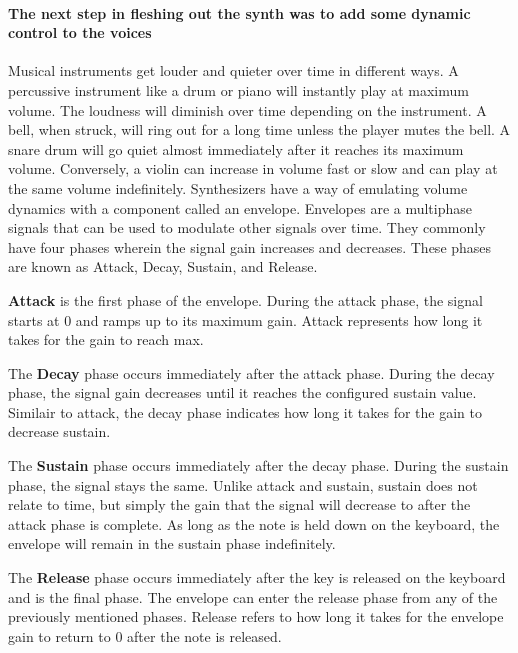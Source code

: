 \documentclass[acmlarge,screen]{acmart}
\begin{document}
	\paragraph{The next step in fleshing out the synth was to add some dynamic control to the voices} Musical instruments get louder and quieter over time in different ways. A percussive instrument like a drum or piano will instantly play at maximum volume. The loudness will diminish over time depending on the instrument. A bell, when struck, will ring out for a long time unless the player mutes the bell. A snare drum will go quiet almost immediately after it reaches its maximum volume. Conversely, a violin can increase in volume fast or slow and can play at the same volume indefinitely. Synthesizers have a way of emulating volume dynamics with a component called an envelope. Envelopes are a multiphase signals that can be used to modulate other signals over time. They commonly have four phases wherein the signal gain increases and decreases. These phases are known as Attack, Decay, Sustain, and Release.
	
	\textbf{Attack} is the first phase of the envelope. During the attack phase, the signal starts at 0 and ramps up to its maximum gain. Attack represents how long it takes for the gain to reach max.

	The \textbf{Decay} phase occurs immediately after the attack phase. During the decay phase, the signal gain decreases until it reaches the configured sustain value. Similair to attack, the decay phase indicates how long it takes for the gain to decrease sustain.

	The \textbf{Sustain} phase occurs immediately after the decay phase. During the sustain phase, the signal stays the same. Unlike attack and sustain, sustain does not relate to time, but simply the gain that the signal will decrease to after the attack phase is complete. As long as the note is held down on the keyboard, the envelope will remain in the sustain phase indefinitely.

	The \textbf{Release} phase occurs immediately after the key is released on the keyboard and is the final phase. The envelope can enter the release phase from any of the previously mentioned phases. Release refers to how long it takes for the envelope gain to return to 0 after the note is released. \cite{hass_2021}
\end{document}
